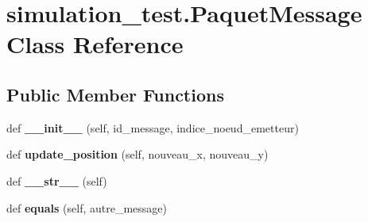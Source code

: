 \hypertarget{classsimulation__test_1_1PaquetMessage}{}\section{simulation\+\_\+test.\+Paquet\+Message Class Reference}
\label{classsimulation__test_1_1PaquetMessage}
\subsection*{Public Member Functions}
\begin{DoxyCompactItemize}
\item 
def {\bfseries \+\_\+\+\_\+init\+\_\+\+\_\+} (self, id\+\_\+message, indice\+\_\+noeud\+\_\+emetteur)\hypertarget{classsimulation__test_1_1PaquetMessage_a62b232deb53d754dcf06bd66a7570c44}{}\label{classsimulation__test_1_1PaquetMessage_a62b232deb53d754dcf06bd66a7570c44}

\item 
def {\bfseries update\+\_\+position} (self, nouveau\+\_\+x, nouveau\+\_\+y)\hypertarget{classsimulation__test_1_1PaquetMessage_a9c09027d93b72814c27d04ee938cefd8}{}\label{classsimulation__test_1_1PaquetMessage_a9c09027d93b72814c27d04ee938cefd8}

\item 
def {\bfseries \+\_\+\+\_\+str\+\_\+\+\_\+} (self)\hypertarget{classsimulation__test_1_1PaquetMessage_ab3da3baabd0e52b436a04454e8915220}{}\label{classsimulation__test_1_1PaquetMessage_ab3da3baabd0e52b436a04454e8915220}

\item 
def {\bfseries equals} (self, autre\+\_\+message)\hypertarget{classsimulation__test_1_1PaquetMessage_a3b56282b69ddd150719229c771fe7640}{}\label{classsimulation__test_1_1PaquetMessage_a3b56282b69ddd150719229c771fe7640}

\end{DoxyCompactItemize}
